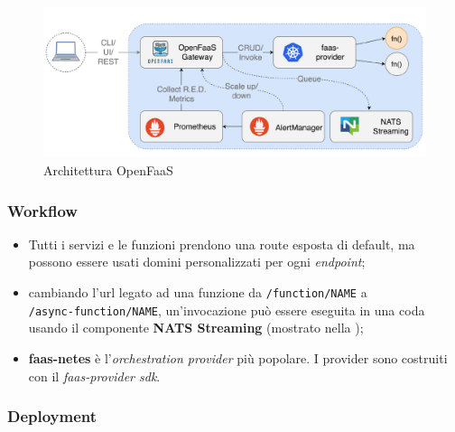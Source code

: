 \documentclass[12pt,a4paper,openany,twoside]{book}
\begin{document}
\begin{figure}[ht]
    \centering
    \includegraphics[width=\linewidth]{figures/OpenFaaS_architecture.pdf}
    \caption{Architettura OpenFaaS}
    \label{fig:architettura-openfaas}
\end{figure}

\subsubsection{Workflow}

\begin{itemize}
    \item Tutti i servizi e le funzioni prendono una route esposta di default, ma possono essere usati domini personalizzati per ogni \textit{endpoint};
    
    \item  cambiando l'\ac{url} legato ad una funzione da \texttt{/function/NAME} a \\
    \texttt{/async-function/NAME}, un'invocazione può essere eseguita in una coda usando il componente \textbf{NATS Streaming} (mostrato nella );
    
    \item \textbf{faas-netes} è l'\textit{orchestration provider} più popolare. I provider sono costruiti con il \textit{faas-provider \ac{sdk}}.
\end{itemize}

\subsubsection{Deployment}
\end{document}
